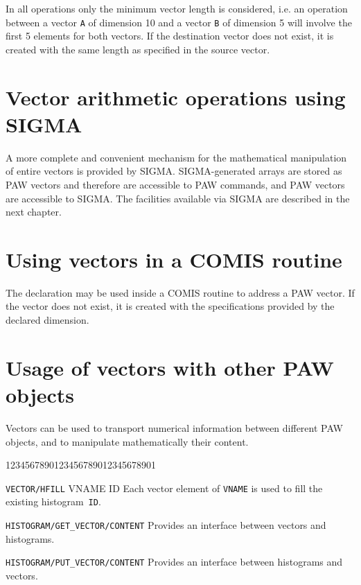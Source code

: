 In all operations only the minimum vector length is considered,
i.e. an operation between a vector \texttt{A} of dimension 10 and a vector 
\texttt{B} of dimension 5 will involve the first 5 elements for both vectors.
If the destination vector does not exist,
it is created with the same length as specified in the source vector.

\section{Vector arithmetic operations using SIGMA}

A more complete and convenient mechanism for the mathematical
manipulation of entire vectors is provided by SIGMA.
SIGMA-generated arrays are stored as
PAW vectors and therefore are accessible
to PAW commands, and PAW vectors are accessible to SIGMA.
The facilities available via SIGMA are described in the next chapter.

\section{Using vectors in a COMIS routine}
 
The declaration 
may be used inside a COMIS routine to address a PAW vector.
If the vector does not exist, it is created with the specifications
provided by the declared dimension.

\section{Usage of vectors with other PAW objects}
 
Vectors can be used to transport
numerical information between different PAW objects, and
to manipulate mathematically their content.

\begin{DLtt}{1234567890123456789012345678901}
\item[\texttt{VECTOR/HFILL} VNAME ID]
     Each vector element of \texttt{VNAME} 
     is used to fill the existing \mbox{histogram \texttt{ID}.}
\item[\texttt{HISTOGRAM/GET_VECTOR/CONTENT}]
     Provides an interface between vectors and histograms.
\item[\texttt{HISTOGRAM/PUT_VECTOR/CONTENT}]
     Provides an interface between histograms and vectors.
\end{DLtt}


